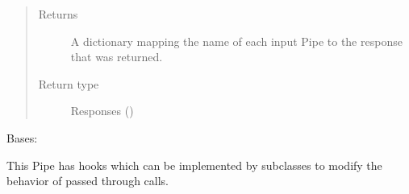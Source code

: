 \documentclass[letterpaper,10pt,english]{sphinxmanual}
\begin{document}
\begin{fulllineitems}
\begin{fulllineitems}
\begin{quote}
\begin{description}
\begin{itemize}
\end{itemize}

\item[{Returns}] \leavevmode
A dictionary mapping the name of each input Pipe to the response that was returned.

\item[{Return type}] \leavevmode
Responses ()

\end{description}\end{quote}

\end{fulllineitems}


\end{fulllineitems}


\begin{fulllineitems}
\label{\detokenize{Fireworks:Fireworks.core.pipe.HookedPassThroughPipe}}
Bases: {\hyperref[\detokenize{Fireworks:Fireworks.core.pipe.Pipe}]{}}

This Pipe has hooks which can be implemented by subclasses to modify the behavior of
passed through calls.

\begin{fulllineitems}
\label{\detokenize{Fireworks:Fireworks.core.pipe.HookedPassThroughPipe.name}}
\end{fulllineitems}


\end{fulllineitems}

\label{\detokenize{Fireworks:module-Fireworks.core.cache}}
\end{document}
